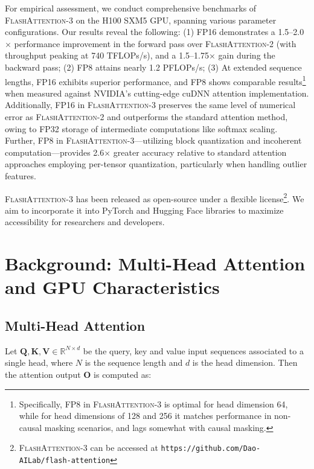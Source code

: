For empirical assessment, we conduct comprehensive benchmarks of \textsc{FlashAttention-3} on the H100 SXM5 GPU, spanning various parameter configurations. Our results reveal the following: (1) FP16 demonstrates a 1.5–2.0$\times$ performance improvement in the forward pass over \textsc{FlashAttention-2} (with throughput peaking at 740 TFLOPs/s), and a 1.5–1.75$\times$ gain during the backward pass; (2) FP8 attains nearly 1.2 PFLOPs/s; (3) At extended sequence lengths, FP16 exhibits superior performance, and FP8 shows comparable results\footnote{Specifically, FP8 in \textsc{FlashAttention-3} is optimal for head dimension 64, while for head dimensions of 128 and 256 it matches performance in non-causal masking scenarios, and lags somewhat with causal masking.} when measured against NVIDIA's cutting-edge cuDNN attention implementation. Additionally, FP16 in \textsc{FlashAttention-3} preserves the same level of numerical error as \textsc{FlashAttention-2} and outperforms the standard attention method, owing to FP32 storage of intermediate computations like softmax scaling. Further, FP8 in \textsc{FlashAttention-3}—utilizing block quantization and incoherent computation—provides 2.6$\times$ greater accuracy relative to standard attention approaches employing per-tensor quantization, particularly when handling outlier features.

\textsc{FlashAttention-3} has been released as open-source under a flexible license\footnote{\textsc{FlashAttention-3} can be accessed at \texttt{https://github.com/Dao-AILab/flash-attention}}. We aim to incorporate it into PyTorch and Hugging Face libraries to maximize accessibility for researchers and developers.

\section{Background: Multi-Head Attention and GPU Characteristics}
\label{sec:background}

\subsection{Multi-Head Attention}
\label{subsec:multi_head_attn}

Let $\mathbf{Q}, \mathbf{K}, \mathbf{V} \in \mathbb{R}^{N \times d}$ be the query, key and value input sequences associated to a single head, where $N$ is the sequence length and $d$ is the head dimension. Then the attention output $\mathbf{O}$ is computed as:

